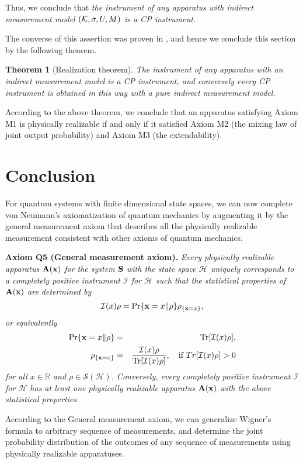 \documentclass[graybox]{svmult}
\newcommand{\beq}{\begin{equation}}
\newcommand{\eeq}{\end{equation}}
\newcommand{\beqa}{\begin{eqnarray}}
\newcommand{\eeqa}{\end{eqnarray}}
\newcommand{\bA}{{\bf A}}
\newcommand{\bS}{{\bf S}}
\newcommand{\cH}{{\mathcal H}}
\newcommand{\cI}{{\mathcal I}}
\newcommand{\cS}{{\mathcal S}}
\newcommand{\mb}{\mbox}
\newcommand{\rh}{\rho}
\newcommand{\Tr}{\mbox{\rm Tr}}
\newcommand{\bx}{{\bf x}}
\newtheorem{Theorem}{Theorem}
\newcommand{\R}{\mathbb{R}}
\begin{document}
Thus, we conclude that 
{\em the instrument of any apparatus
with indirect measurement  model
$({\cal K},\sigma,U,M)$ is a CP instrument}.  

The converse of this assertion was proven in \cite{84QC},
and hence we conclude this section by the following theorem.

\begin{Theorem}[Realization theorem]
\label{th:realization}
The instrument of any apparatus
with an indirect measurement model
is a CP instrument,
and conversely every CP instrument is obtained in this
way with a pure indirect measurement model.
\end{Theorem}

According to the above theorem, we conclude that an apparatus satisfying Axiom M1
is physically realizable if and only if it satisfied Axiom M2 (the mixing law of joint output 
probability) and Axiom M3 (the extendability). 


\section{Conclusion}
 For quantum systems with finite dimensional state spaces,
we can now complete von Neumann's axiomatization of quantum 
mechanics by augmenting it by the general measurement axiom that describes 
all the physically realizable measurement consistent with other axioms
of quantum mechanics.
\bigskip

{\bf Axiom Q5 (General measurement axiom).}
{\em Every physically realizable apparatus $\bA(\bx)$ for the system $\bS$ with the
state space $\cH$ uniquely corresponds to a completely positive instrument $\cI$ for $\cH$
such that the statistical properties of $\bA(\bx)$ are determined by 
\beq
\cI(x)\rh=\Pr\{\bx=x\|\rh\}\rh_{\{\bx=x\}},
\eeq
or equivalently
\beqa
\Pr\{\bx=x\|\rh\}&=&\Tr[\cI(x)\rh], \\
\rh_{\{\bx=x\}}&=&\frac{\cI(x)\rh}{\Tr[\cI(x)\rh]},\quad\mb{if $Tr[\cI(x)\rh]>0$}
\eeqa
for all $x\in\R$ and $\rh\in\cS(\cH)$.  Conversely, every completely positive instrument $\cI$ for $\cH$
has at least one physically realizable apparatus $\bA(\bx)$ with the above
statistical properties.}
\bigskip

According to the General measurement axiom, 
we can generalize Wigner's formula to arbitrary sequence of measurements,
and determine the joint probability distribution of the outcomes of
 any sequence of  measurements using physically realizable apparatuses.
\end{document}
